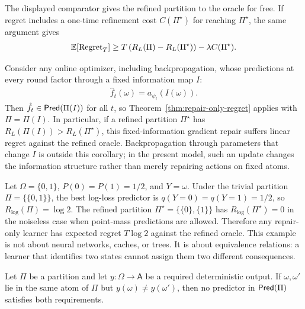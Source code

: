 The displayed comparator gives the refined partition to the oracle for free. If regret includes a one-time refinement cost $C(\Pi^\star)$ for reaching $\Pi^\star$, the same argument gives
\begin{align*}
\operatorname*{\mathbb{E}}[\mathrm{Regret}_T]
\ge
T\left(R_L(\Pi)-R_L(\Pi^\star)\right)-\lambda C(\Pi^\star).
\end{align*}

\begin{corollary}
\label{cor:fixed-information-gradient-repair}
Consider any online optimizer, including backpropagation, whose predictions at every round factor through a fixed information map $I$:
\begin{align*}
\hat f_t(\omega)=a_{\psi_t}(I(\omega)).
\end{align*}
Then $\hat f_t\in\mathsf{Pred}(\Pi(I))$ for all $t$, so Theorem~\ref{thm:repair-only-regret} applies with $\Pi=\Pi(I)$. In particular, if a refined partition $\Pi^\star$ has $R_L(\Pi(I))>R_L(\Pi^\star)$, this fixed-information gradient repair suffers linear regret against the refined oracle. Backpropagation through parameters that change $I$ is outside this corollary; in the present model, such an update changes the information structure rather than merely repairing actions on fixed atoms.
\end{corollary}

\begin{example}
\label{ex:two-state-separation}
Let $\Omega=\{0,1\}$, $P(0)=P(1)=1/2$, and $Y=\omega$. Under the trivial partition $\Pi=\{\{0,1\}\}$, the best log-loss predictor is $q(Y=0)=q(Y=1)=1/2$, so $R_{\log}(\Pi)=\log 2$. The refined partition $\Pi^\star=\{\{0\},\{1\}\}$ has $R_{\log}(\Pi^\star)=0$ in the noiseless case when point-mass predictions are allowed. Therefore any repair-only learner has expected regret $T\log 2$ against the refined oracle. This example is not about neural networks, caches, or trees. It is about equivalence relations: a learner that identifies two states cannot assign them two different consequences.
\end{example}

\begin{corollary}
\label{thm:contradiction:informal}
Let $\Pi$ be a partition and let $y:\Omega\to\mathsf A$ be a required deterministic output. If $\omega,\omega'$ lie in the same atom of $\Pi$ but $y(\omega)\ne y(\omega')$, then no predictor in $\mathsf{Pred}(\Pi)$ satisfies both requirements.
\end{corollary}


